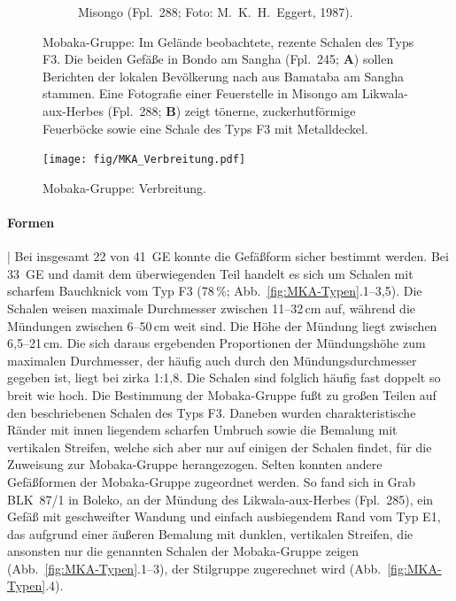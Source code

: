 \begin{figure}[p]
\begin{subfigure}{\columnwidth}
		\caption{Misongo (Fpl.~288; Foto: M.~K.~H.~Eggert, 1987).}
		\label{fig:MIS87-101_Detail}
	\end{subfigure}
	\caption{Mobaka-Gruppe: Im Gelände beobachtete, rezente Schalen des Typs F3. Die beiden Gefäße in Bondo am \mbox{Sangha} (Fpl.~245; \textbf{A}) sollen Berichten der lokalen Bevölkerung nach aus Bamataba am \mbox{Sangha} stammen. Eine Fotografie einer Feuerstelle in Misongo am \mbox{Likwala}-\mbox{aux}-\mbox{Herbes} (Fpl.~288; \textbf{B}) zeigt tönerne, zuckerhutförmige Feuerböcke sowie eine Schale des Typs F3 mit Metalldeckel.}
	\label{fig:rezenteMBK-Schalen}
\end{figure}

\begin{figure}[p]
	\centering
	\texttt{[image: fig/MKA\_Verbreitung.pdf]}
	\caption{Mobaka-Gruppe: Verbreitung.}
	\label{fig:MKA_Verbreitung}
\end{figure}

\paragraph{Formen}\hspace{-.5em}|\hspace{.5em}%
Bei insgesamt 22 von 41~GE konnte die Gefäßform sicher bestimmt werden. Bei 33~GE und damit dem überwiegenden Teil handelt es sich um Schalen mit scharfem Bauchknick vom Typ F3 (78\,\%; Abb.~\ref{fig:MKA-Typen}.1--3,5). Die Schalen weisen maximale Durchmesser zwischen 11--32\,cm auf, während die Mündungen zwischen 6--50\,cm weit sind. Die Höhe der Mündung liegt zwischen 6,5--21\,cm. Die sich daraus ergebenden Proportionen der Mündungshöhe zum maximalen Durchmesser, der häufig auch durch den Mündungsdurchmesser gegeben ist, liegt bei zirka 1:1,8. Die Schalen sind folglich häufig fast doppelt so breit wie hoch. Die Bestimmung der Mobaka-Gruppe fußt zu großen Teilen auf den beschriebenen Schalen des Typs F3. Daneben wurden charakteristische Ränder mit innen liegendem scharfen Umbruch sowie die Bemalung mit vertikalen Streifen, welche sich aber nur auf einigen der Schalen findet, für die Zuweisung zur Mobaka-Gruppe herangezogen. Selten konnten andere Gefäßformen der Mobaka-Gruppe zugeordnet werden. So fand sich in Grab BLK~87/1 in Boleko, an der Mündung des \mbox{Likwala}-\mbox{aux}-\mbox{Herbes} (Fpl.~285), ein Gefäß mit geschweifter Wandung und einfach ausbiegendem Rand vom Typ E1, das aufgrund einer äußeren Bemalung mit dunklen, vertikalen Streifen, die ansonsten nur die genannten Schalen der Mobaka-Gruppe zeigen (Abb.~\ref{fig:MKA-Typen}.1--3), der Stilgruppe zugerechnet wird (Abb.~\ref{fig:MKA-Typen}.4). 

